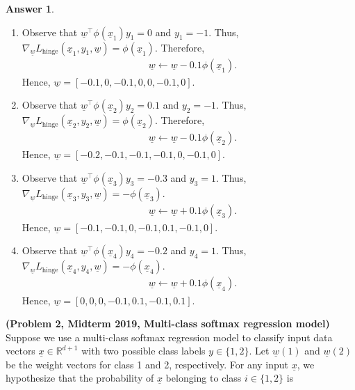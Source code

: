 \documentclass{article}
\theoremstyle{definition}
\newtheorem*{answer}{Answer}
\begin{document}
\begin{question}[start=0]
\begin{answer}
			\begin{enumerate}[label=\textbf{Step \arabic* (datapoint $\underline{x}_\arabic*$):}, itemindent=3.5cm]
				\item Observe that $\underline{w}^\top\phi(\underline{x}_1)y_1=0$ and $y_1=-1$. Thus,  $\nabla_{\underline{w}} L_{\text{hinge}}(\underline{x}_1, y_1, \underline{w}) = \phi(\underline{x}_1)$. Therefore, 
				\begin{align*}
						&\underline{w} \leftarrow \underline{w} - 0.1 \phi(\underline{x}_1).
					\end{align*}
				Hence, $\underline{w}=[-0.1, 0, -0.1, 0, 0, -0.1, 0]$.
				\item Observe that $\underline{w}^\top\phi(\underline{x}_2)y_2=0.1$ and $y_2=-1$. Thus, $\nabla_{\underline{w}} L_{\text{hinge}}(\underline{x}_2, y_2, \underline{w}) = \phi(\underline{x}_2)$. Therefore,
				\begin{align*}
					&\underline{w} \leftarrow \underline{w} - 0.1 \phi(\underline{x}_2).
				\end{align*}
				Hence, $\underline{w}=[-0.2, -0.1, -0.1, -0.1, 0, -0.1, 0]$.
				\item Observe that $\underline{w}^\top\phi(\underline{x}_3)y_3= -0.3$ and $y_3=1$. Thus, $\nabla_{\underline{w}} L_{\text{hinge}}(\underline{x}_3, y_3, \underline{w}) = -\phi(\underline{x}_3)$. \begin{align*}
						&\underline{w} \leftarrow \underline{w} + 0.1\phi(\underline{x}_3).
					\end{align*}
				Hence, $\underline{w}=[-0.1, -0.1, 0, -0.1, 0.1, -0.1, 0]$.
				\item Observe that $\underline{w}^\top\phi(\underline{x}_4)y_4= -0.2$ and $y_4=1$. Thus, $\nabla_{\underline{w}} L_{\text{hinge}}(\underline{x}_4, y_4, \underline{w}) = -\phi(\underline{x}_4)$. \begin{align*}
						&\underline{w} \leftarrow \underline{w} + 0.1 \phi(\underline{x}_4).
					\end{align*}
				Hence, $\underline{w}=[0, 0, 0, -0.1, 0.1, -0.1, 0.1]$.
			\end{enumerate}
			\end{answer}
	\item \textbf{(Problem 2, Midterm 2019, Multi-class softmax regression model)}
	Suppose we use a multi-class softmax regression model to classify input data vectors $\underline{x} \in \mathbb{R}^{d+1}$ with two possible class labels $y \in \{1, 2\}$. Let $\underline{w}(1)$ and $\underline{w}(2)$ be the weight vectors for class 1 and 2, respectively. For any input $\underline{x}$, we hypothesize that the probability of $\underline{x}$ belonging to class $i \in \{1, 2\}$ is

\end{question}
\end{document}
